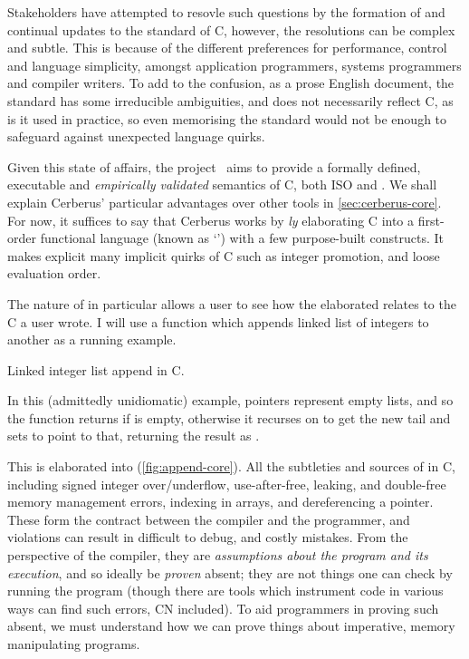Stakeholders have attempted to resovle such questions by the formation of and
continual updates to the  standard of C,\cite{isoC1990} however, the
resolutions can be complex and subtle. This is because of the different
preferences for performance, control and language simplicity, amongst
application programmers, systems programmers and compiler writers. To add to
the confusion, as a prose English document, the standard has some irreducible
ambiguities, and does not necessarily reflect  C, as is it
used in practice, so even memorising the standard would not be enough to
safeguard against unexpected language quirks.

Given this state of affairs, the 
project~ aims to provide a formally defined,
executable and \emph{empirically validated} semantics of C, both ISO and . We shall explain Cerberus' particular advantages over other tools in
\cref{sec:cerberus-core}. For now, it suffices to say that Cerberus works by
\emph{ly} elaborating C into a first-order functional
language (known as `') with a few purpose-built constructs. It
makes explicit many implicit quirks of C such as integer promotion,  and
loose evaluation order.

The  nature of in particular allows a user to see how the
elaborated  relates to the C a user wrote. I will use a function which
appends linked list of integers to another as a running example.

\begin{marginfigure}
    \centering
    \caption{Linked integer list append in C.}\label{fig:append-c}
\end{marginfigure}%

In this (admittedly unidiomatic) example,  pointers represent
empty lists, and so the function returns  if  is empty,
otherwise it recurses on  to get the new tail
 and sets  to point to that,  returning the
result as .

This is elaborated into  (\cref{fig:append-core}). All the
subtleties and sources of  in C, including signed integer over/underflow,
use-after-free, leaking, and double-free memory management errors,
 indexing in arrays, and dereferencing a 
pointer. These form the contract between the compiler and the programmer, and
violations can result in difficult to debug, and costly mistakes. From the
perspective of the compiler, they are \emph{assumptions about the program and
its execution}, and so ideally be \emph{proven} absent; they are not things one
can check by running the program (though there are tools which instrument code
in various ways can find such errors, CN included). To aid programmers in
proving such  absent, we must understand how we can prove things about
imperative, memory manipulating programs.

